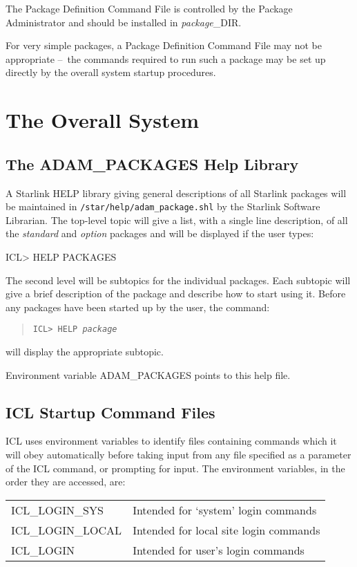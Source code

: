 \documentclass[twoside,11pt,nolof]{starlink}
\providecommand{\dash}{--}
\begin{document}
The Package Definition Command File is controlled by the Package Administrator
and should be installed in \textit{package}\_DIR.

For very simple packages, a Package Definition Command File may not be
appropriate \dash\ the commands required to run such a package may be set up
directly by the overall system startup procedures.

\section{The Overall System}
\subsection{The ADAM\_PACKAGES Help Library}
\label{adamhelp}
A Starlink HELP library giving general descriptions of all Starlink packages
will be maintained in \texttt{/star/help/adam\_package.shl} by the Starlink
Software Librarian.
The top-level topic  will give a list, with a single line
description, of all the \textit{standard} and \textit{option} packages and will be
displayed if the user types:
\begin{terminalv}
ICL> HELP PACKAGES
\end{terminalv}
The second level will be subtopics for the individual packages.
Each subtopic will give a brief description of the package and describe how
to start using it. Before any packages have been started up by the user, the
command:
\begin{quote}
\texttt{ICL> HELP \textit{package}}
\end{quote}
will display the appropriate subtopic.

Environment variable ADAM\_PACKAGES points to this help file.

\subsection{ICL Startup Command
Files\label{icl_startup_command_files}}
ICL uses environment variables to identify files containing
commands which it will obey automatically before taking input from any file
specified as a parameter of the ICL command, or prompting for input.
The environment variables, in the order they are accessed, are:

\begin{tabular}{ll}
ICL\_LOGIN\_SYS   & Intended for `system' login commands\\
ICL\_LOGIN\_LOCAL & Intended for local site login commands\\
ICL\_LOGIN      & Intended for user's login commands
\end{tabular}
\end{document}
